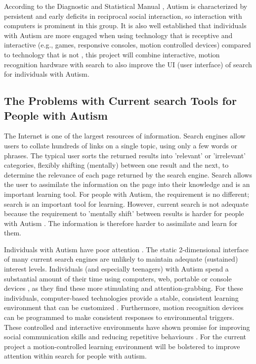 \documentclass[a4paper, 10pt]{article}
\begin{document}
According to the Diagnostic and Statistical Manual \cite{CDC}, Autism is characterized by persistent and early deficits in reciprocal social interaction, so interaction with computers is prominent in this group. It is also well established that individuals with Autism are more engaged when using technology that is receptive and interactive (e.g., games, responsive consoles, motion controlled devices) compared to technology that is not \cite{motioncontrollerforautism}, this project will combine interactive, motion recognition hardware with search to also improve the UI (user interface) of search for individuals with Autism.

\subsection{The Problems with Current search Tools for People with Autism}\label{What should search offer people with Autism}

The Internet is one of the largest resources of information. Search engines allow users to collate hundreds of links on a single topic, using only a few words or phrases. The typical user sorts the returned results into 'relevant' or 'irrelevant' categories, flexibly shifting (mentally) between one result and the next, to determine the relevance of each page returned by the search engine. Search allows the user to assimilate the information on the page into their knowledge and is an important learning tool. For people with Autism, the requirement is no different; search is an important tool for learning. However, current search is not adequate because the requirement to 'mentally shift' between results is harder for people with Autism \cite{disengagement}. The information is therefore harder to assimilate and learn for them. 

Individuals with Autism have poor attention \cite{attention}. The static 2-dimensional interface of many current search engines are unlikely to maintain adequate (sustained) interest levels. Individuals (and especially teenagers) with Autism spend a substantial amount of their time using computers, web, portable or console devices \cite{Shane and Albert}, as they find these more stimulating and attention-grabbing. For these individuals, computer-based technologies provide a stable, consistent learning environment that can be customized \cite{moore}. Furthermore, motion recognition devices can be programmed to make consistent responses to environmental triggers. These controlled and interactive environments have shown promise for improving social communication skills and reducing repetitive behaviours \cite{gameshealth}. For the current project a motion-controlled learning environment will be bolstered to improve attention within search for people with autism. 
\end{document}
